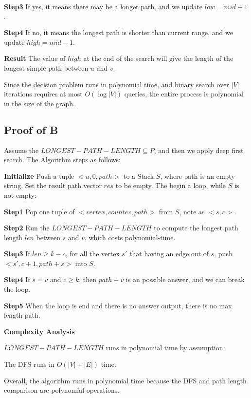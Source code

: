 \documentclass[12pt]{article}
\begin{document}
\textbf{Step3} If yes, it means there may be a longer path, and we update $low = mid + 1$.

\textbf{Step4} If no, it means the longest path is shorter than current range, and we update $high = mid - 1$.

\textbf{Result} The value of $high$ at the end of the search will give the length of the longest simple path between $u$ and $v$.

Since the decision problem runs in polynomial time, and binary search over $|V|$ iterations requires at most $O(\log |V|)$ queries, the entire process is polynomial in the size of the graph.

\subsection{Proof of B}
Assume the $LONGEST-PATH-LENGTH \subseteq P$, and then we apply deep first search. The Algorithm steps as follows:
 
\textbf{Initialize} Push a tuple $<u, 0, path>$ to a Stack $S$, where path is an empty string. Set the result path vector $res$ to be empty. The begin a loop, while $S$ is not empty:

\textbf{Step1} Pop one tuple of $<vertex, counter, path>$ from $S$, note as $<s, c>$. 

\textbf{Step2} Run the $LONGEST-PATH-LENGTH$ to compute the longest path length $len$ between $s$ and $v$, which costs polynomial-time.

\textbf{Step3} If $len \geq k-c$, for all the vertex $s'$ that having an edge out of $s$, push $<s', c+1, path+s>$ into $S$.

\textbf{Step4} If $s = v$ and $c \ge k$, then $path + v$ is an possible answer, and we can break the loop.   

\textbf{Step5} When the loop is end and there is no answer output, there is no max length path.

\textbf{Complexity Analysis}

 $LONGEST-PATH-LENGTH$ runs in polynomial time by assumption.

The DFS runs in $O(|V| + |E|)$ time.

Overall, the algorithm runs in polynomial time because the DFS and path length comparison are polynomial operations.
\end{document}
